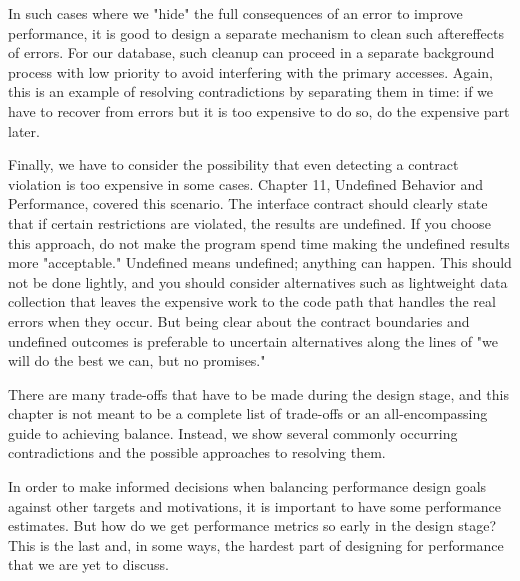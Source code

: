 In such cases where we "hide" the full consequences of an error to improve performance, it is good to design a separate mechanism to clean such aftereffects of errors. For our database, such cleanup can proceed in a separate background process with low priority to avoid interfering with the primary accesses. Again, this is an example of resolving contradictions by separating them in time: if we have to recover from errors but it is too expensive to do so, do the expensive part later.

Finally, we have to consider the possibility that even detecting a contract violation is too expensive in some cases. Chapter 11, Undefined Behavior and Performance, covered this scenario. The interface contract should clearly state that if certain restrictions are violated, the results are undefined. If you choose this approach, do not make the program spend time making the undefined results more "acceptable." Undefined means undefined; anything can happen. This should not be done lightly, and you should consider alternatives such as lightweight data collection that leaves the expensive work to the code path that handles the real errors when they occur. But being clear about the contract boundaries and undefined outcomes is preferable to uncertain alternatives along the lines of "we will do the best we can, but no promises." 

There are many trade-offs that have to be made during the design stage, and this chapter is not meant to be a complete list of trade-offs or an all-encompassing guide to achieving balance. Instead, we show several commonly occurring contradictions and the possible approaches to resolving them. 

In order to make informed decisions when balancing performance design goals against other targets and motivations, it is important to have some performance estimates. But how do we get performance metrics so early in the design stage? This is the last and, in some ways, the hardest part of designing for performance that we are yet to discuss.














